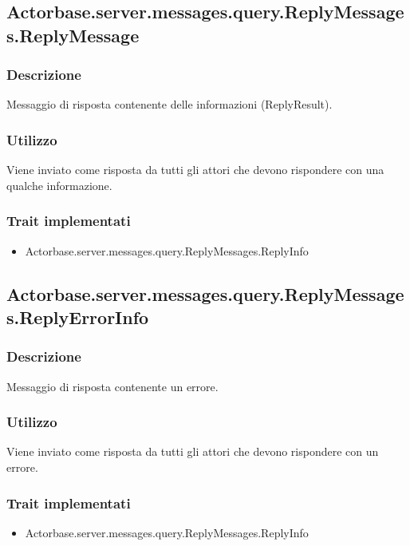 \documentclass[a4paper]{article}
\begin{document}
			\subsection{Actorbase.server.messages.query.ReplyMessages.ReplyMessage}
			\subsubsection{Descrizione}
				Messaggio di risposta contenente delle informazioni (ReplyResult).
				
			\subsubsection{Utilizzo}
				Viene inviato come risposta da tutti gli attori che devono rispondere con una qualche informazione.
				
			\subsubsection{Trait implementati}
				\begin{itemize}
					\item Actorbase.server.messages.query.ReplyMessages.ReplyInfo
				\end{itemize}
				
					\subsection{Actorbase.server.messages.query.ReplyMessages.ReplyErrorInfo}
			\subsubsection{Descrizione}
				Messaggio di risposta contenente un errore.
				
			\subsubsection{Utilizzo}
				Viene inviato come risposta da tutti gli attori che devono rispondere con un errore.
				
			\subsubsection{Trait implementati}
				\begin{itemize}
					\item Actorbase.server.messages.query.ReplyMessages.ReplyInfo
				\end{itemize}
				
\end{document}
